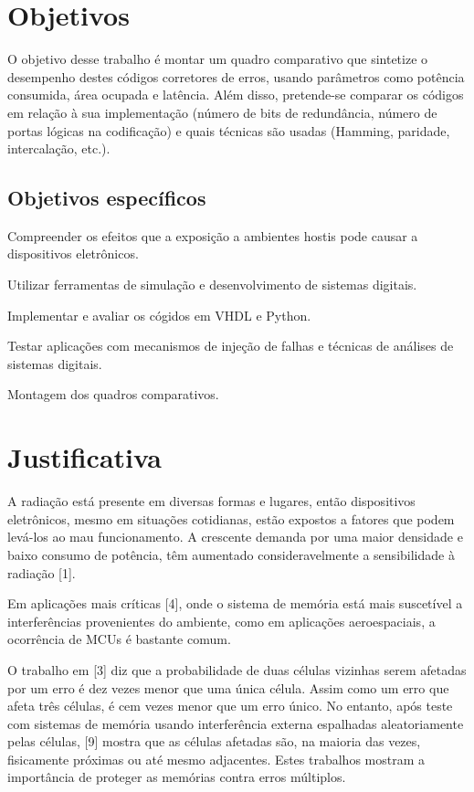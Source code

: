\section{Objetivos}

O objetivo desse trabalho é montar um quadro comparativo que sintetize o desempenho destes códigos corretores de erros, usando parâmetros como potência consumida, área ocupada e latência. Além disso, pretende-se comparar os códigos em relação à sua implementação (número de bits de redundância, número de portas lógicas na codificação) e quais técnicas são usadas (Hamming, paridade, intercalação, etc.).


\subsection{Objetivos específicos}

Compreender os efeitos que a exposição a ambientes hostis pode causar a dispositivos eletrônicos.

Utilizar ferramentas de simulação e desenvolvimento de sistemas digitais.

Implementar e avaliar os cógidos em VHDL e Python.

Testar aplicações com mecanismos de injeção de falhas e técnicas de análises de sistemas digitais.

Montagem dos quadros comparativos.

\section{Justificativa}

A radiação está presente em diversas formas e lugares, então dispositivos eletrônicos, mesmo em situações cotidianas, estão expostos a fatores que podem levá-los ao mau funcionamento. A crescente demanda por uma maior densidade e baixo consumo de potência, têm aumentado consideravelmente a sensibilidade à radiação [1].

Em aplicações mais críticas [4], onde o sistema de memória está mais suscetível a interferências provenientes do ambiente, como em aplicações aeroespaciais, a ocorrência de MCUs é bastante comum.

O trabalho em [3] diz que a probabilidade de duas células vizinhas serem afetadas por um erro é dez vezes menor que uma única célula. Assim como um erro que afeta três células, é cem vezes menor que um erro único. No entanto, após teste com sistemas de memória usando interferência externa espalhadas aleatoriamente pelas células, [9] mostra que as células afetadas são, na maioria das vezes, fisicamente próximas ou até mesmo adjacentes. Estes trabalhos mostram a importância de proteger as memórias contra erros múltiplos.

